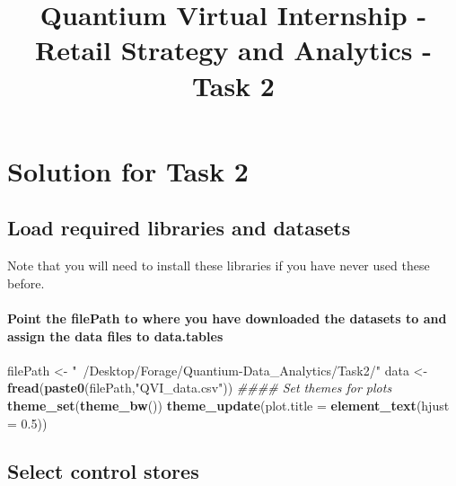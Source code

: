 \documentclass[]{article}
\title{Quantium Virtual Internship - Retail Strategy and Analytics - Task 2}
\author{}
\date{\vspace{-2.5em}}
\newenvironment{Shaded}{\begin{snugshade}}{\end{snugshade}}
\newcommand{\CommentTok}[1]{\textcolor[rgb]{0.56,0.35,0.01}{\textit{#1}}}
\newcommand{\DataTypeTok}[1]{\textcolor[rgb]{0.13,0.29,0.53}{#1}}
\newcommand{\FloatTok}[1]{\textcolor[rgb]{0.00,0.00,0.81}{#1}}
\newcommand{\KeywordTok}[1]{\textcolor[rgb]{0.13,0.29,0.53}{\textbf{#1}}}
\newcommand{\NormalTok}[1]{#1}
\newcommand{\StringTok}[1]{\textcolor[rgb]{0.31,0.60,0.02}{#1}}
\let\oldparagraph\paragraph
\renewcommand{\paragraph}[1]{\oldparagraph{#1}\mbox{}}
\begin{document}
\maketitle

\hypertarget{solution-for-task-2}{%
\section{Solution for Task 2}\label{solution-for-task-2}}

\hypertarget{load-required-libraries-and-datasets}{%
\subsection{Load required libraries and
datasets}\label{load-required-libraries-and-datasets}}

Note that you will need to install these libraries if you have never
used these before.

\hypertarget{point-the-filepath-to-where-you-have-downloaded-the-datasets-to-and-assign-the-data-files-to-data.tables}{%
\paragraph{Point the filePath to where you have downloaded the datasets
to and assign the data files to
data.tables}\label{point-the-filepath-to-where-you-have-downloaded-the-datasets-to-and-assign-the-data-files-to-data.tables}}

\begin{Shaded}
\begin{Highlighting}[]
\NormalTok{filePath <-}\StringTok{ "~/Desktop/Forage/Quantium-Data_Analytics/Task2/"}
\NormalTok{data <-}\StringTok{ }\KeywordTok{fread}\NormalTok{(}\KeywordTok{paste0}\NormalTok{(filePath,}\StringTok{"QVI_data.csv"}\NormalTok{))}
\CommentTok{#### Set themes for plots}
\KeywordTok{theme_set}\NormalTok{(}\KeywordTok{theme_bw}\NormalTok{())}
\KeywordTok{theme_update}\NormalTok{(}\DataTypeTok{plot.title =} \KeywordTok{element_text}\NormalTok{(}\DataTypeTok{hjust =} \FloatTok{0.5}\NormalTok{))}
\end{Highlighting}
\end{Shaded}

\hypertarget{select-control-stores}{%
\subsection{Select control stores}\label{select-control-stores}}
\end{document}
